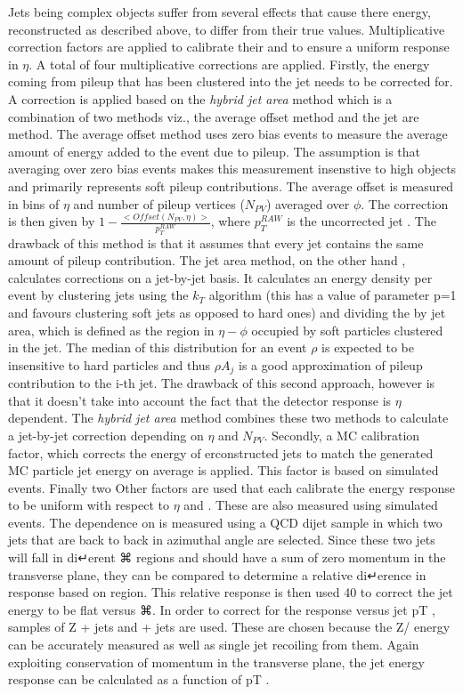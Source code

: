 Jets being complex objects suffer from several effects that cause there energy, reconstructed as described above, to differ from their true values. Multiplicative correction factors are applied to calibrate their \pt and to ensure a uniform response in $\eta$. A total of four multiplicative corrections are applied. Firstly, the energy coming from pileup that has been clustered into the jet needs to be corrected for. A correction is applied based on the \textit{hybrid jet area} method which is a combination of two methods viz., the average offset method and the jet are method. The average offset method uses zero bias events to measure the average amount of energy added to the event due to pileup. The assumption is that averaging over zero bias events makes this measurement insenstive to high \pt objects and primarily represents soft pileup contributions. The average offset is measured in bins of $\eta$ and number of pileup vertices ($N_{PV}$) averaged over $\phi$. The correction is then given by $1-\frac{<Offset(N_{PV},\eta)>}{p_{T}^{RAW}}$, where $p_{T}^{RAW}$  is the uncorrected jet \pt. The drawback of this method is that it assumes that every jet contains the same amount of pileup contribution. The jet area method, on the other hand , calculates corrections on a jet-by-jet basis. It calculates an energy density  per event  by clustering jets using the $k_{T}$ algorithm (this has a value of parameter p=1 and favours clustering soft jets as opposed to hard ones) and dividing the \pt by jet area, which is defined as the region in $\eta-\phi$ occupied by soft particles clustered in the jet. The median of this distribution for an event $\rho$ is expected to be insensitive to hard particles and thus $\rho A_{j}$ is a good approximation of pileup contribution to the i-th jet. The drawback of this second approach, however is that it doesn't take into account the fact that the detector response is $\eta$ dependent. The \textit{hybrid jet area} method combines these two methods to calculate a jet-by-jet correction depending on $\eta$ and $N_{PV}$. Secondly, a MC calibration factor, which corrects the energy of erconstructed jets to match the generated MC particle jet energy on average is applied. This factor is based on simulated events. Finally two Other factors are used that each calibrate the energy response to be uniform with respect to $\eta$ and \pt. These are also measured using simulated events.
The dependence on is measured using a QCD dijet sample in which two jets that are back to back in azimuthal angle are selected. Since these two jets will fall in di↵erent ⌘ regions and should have a sum of zero momentum in the transverse plane, they can be compared to determine a relative di↵erence in response based on region. This relative response is then used
40
to correct the jet energy to be flat versus ⌘. In order to correct for the response versus jet pT , samples of Z + jets and   + jets are used. These are chosen because the Z/  energy can be accurately measured as well as single jet recoiling from them. Again exploiting conservation of momentum in the transverse plane, the jet energy response can be calculated as a function of pT .


